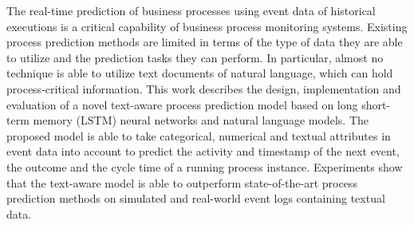 The real-time prediction of business processes using event data of historical executions is a critical capability of business process monitoring systems.
Existing process prediction methods are limited in terms of the type of data they are able to utilize and the prediction tasks they can perform.
In particular, almost no technique is able to utilize text documents of natural language, which can hold process-critical information.
This work describes the design, implementation and evaluation of a novel text-aware process prediction model based on long short-term memory (LSTM) neural networks and natural language models.
The proposed model is able to take categorical, numerical and textual attributes in event data into account to predict the activity and timestamp of the next event, the outcome and the cycle time of a running process instance.
Experiments show that the text-aware model is able to outperform state-of-the-art process prediction methods on simulated and real-world event logs containing textual data.